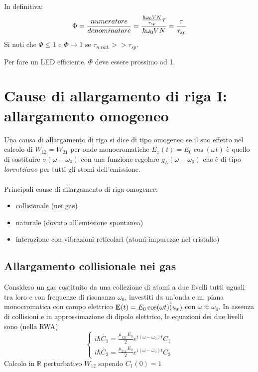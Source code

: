 In definitiva:
\begin{equation}
    \Phi = \frac{numeratore}{denominatore} = \frac{\frac{\hbar \omega_0 V N}{\tau_{sp}} \tau}{\hbar \omega_0 V N} = \frac{\tau}{\tau_{sp}}
\end{equation}
Si noti che $\Phi \leq 1$ e $\Phi \to 1$ se $\tau_{n.rad.} >> \tau_{sp}$.

Per fare un LED efficiente, $\Phi$ deve essere prossimo ad 1.


\section{Cause di allargamento di riga I: allargamento omogeneo}
Una causa di allargamento di riga si dice di tipo omogeneo se il suo effetto nel calcolo di $W_{12} = W_{21}$ per onde monocromatiche $E_x(t) = E_0 \cos(\omega t)$ è quello di sostituire $\sigma(\omega - \omega_0)$ con una funzione regolare $g_L(\omega - \omega_0)$ che è di tipo \textit{lorentziano} per tutti gli stomi dell'emissione.\\
\\
Principali cause di allargamento di riga omogenee:
\begin{itemize}
\item collisionale (nei gas)
\item naturale (dovuto all'emissione spontanea)
\item interazione con vibrazioni reticolari (atomi impurezze nel cristallo)
\end{itemize}

\subsection{Allargamento collisionale nei gas}
Considero un gas costituito da una collezione di atomi a due livelli tutti uguali tra loro e con frequenze di risonanza $\omega_0$, investiti da un'onda e.m. piana monocromatica con campo elettrico $\mathbf{E}(t) = E_0 \cos(\omega t)\hat(u_x)$ con $\omega \approx \omega_0$. In assenza di collisioni e in approssimazione di dipolo elettrico, le equazioni dei due livelli sono (nella RWA):
\begin{equation*}
\begin{cases}
i\hbar \dot{C_1} = \frac{\mu_{12x}E_0}{2} e^{i(\omega - \omega_0)t} C_1\\
i \hbar \dot{C_2} = \frac{\mu_{21x}E_0}{2} e^{i(\omega - \omega_0)t} C_2
\end{cases}
\end{equation*}
Calcolo in $\mathbb{R}$ perturbativo $W_{12}$ sapendo $C_1(0) = 1$

